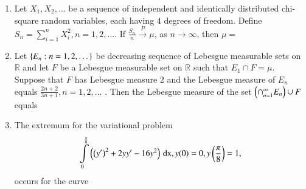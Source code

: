 \documentclass[journal]{IEEEtran}
\begin{document}
\begin{enumerate}
\item Let $X_1,X_2,\dots$ be a sequence of independent and identically distributed chi-square random variables, each having $4$ degrees of freedom. Define $S_n=\sum_{i=1}^{n}X_i ^2, n=1,2,\dots$. If $\frac{S_n}{n} \xrightarrow{P} \mu$, as $n \rightarrow \infty$, then $\mu=$
\begin{enumerate}
\end{enumerate}

\item Let $\left\{E_n: n=1,2,\dots\right\}$ be decreasing sequence of Lebesgue measurable sets on $\mathbb R$ and let $F$ be a Lebesgue measurable set on $\mathbb R$ such that $E_1\cap F=\mu$. Suppose that $F$ has Lebesgue measure $2$ and the Lebesgue measure of $E_n$ equals $\frac{2n+2}{3n+1}, n=1,2,\dots$ . Then the Lebesgue measure of the set $\left(\cap_{n=1}^{\infty}E_n\right)\cup F$ equals
\begin{enumerate}
\end{enumerate}

\item The extremum for the variational problem 
\begin{align*}
    \int\limits_0^\frac{\pi}{8} \left(\left(y'\right)^2+2yy'-16y^2\right)\, \text{dx}, y(0)=0, y\left(\frac{\pi}{8}\right)=1,
\end{align*}
occurs for the curve
\begin{enumerate}
\end{enumerate}
\end{enumerate}
\end{document}
